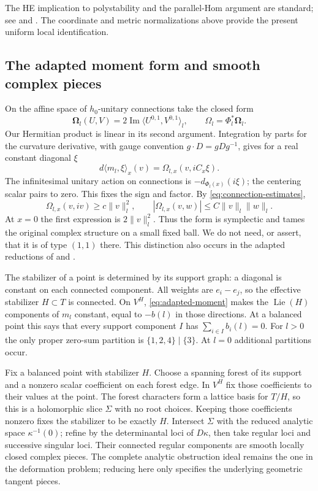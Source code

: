 \documentclass[11pt]{amsart}
\theoremstyle{definition}
\theoremstyle{remark}
\newcommand{\Lie}{\operatorname{Lie}}
\begin{document}
The HE implication to polystability and the parallel-Hom argument are
standard; see \cite[Theorem~5.8.3 and Proposition~4.1.7]{Kobayashi87}
and \cite[Section~4 and Proposition~7.4]{BuchdahlSchumacher20}.
The coordinate and metric normalizations above provide the present
uniform local identification.

\subsection{The adapted moment form and smooth complex pieces}
On the affine space of $h_0$-unitary connections take the closed form
\[
 \boldsymbol\Omega_l(U,V)
       =2\operatorname{Im}\langle U^{0,1},V^{0,1}\rangle_l,
 \qquad \Omega_l=\Phi_l^*\boldsymbol\Omega_l.
\]
Our Hermitian product is linear in its second argument. Integration
by parts for the curvature derivative, with gauge convention
$g\cdot D=gDg^{-1}$, gives for a real constant diagonal $\xi$
\begin{equation}\label{eq:adapted-moment}
 d\langle m_l,\xi\rangle_x(v)
       =\Omega_{l,x}(v,iC_x\xi).
\end{equation}
The infinitesimal unitary action on connections is
$-d_{\Phi_l(x)}(i\xi)$; the centering scalar pairs to zero.
This fixes the sign and factor. By \eqref{eq:connection-estimates},
\begin{equation}\label{eq:taming}
 \Omega_{l,x}(v,iv)\ge c\|v\|_l^2,\qquad
 |\Omega_{l,x}(v,w)|\le C\|v\|_l\|w\|_l.
\end{equation}
At $x=0$ the first expression is $2\|v\|_l^2$. Thus the form is
symplectic and tames the original complex structure on a small fixed
ball. We do not need, or assert, that it is of type $(1,1)$ there.
This distinction also occurs in the adapted reductions of
\cite[Section~3]{ClarkeTipler24} and \cite[Section~4.1]{Delloque25}.

The stabilizer of a point is determined by its support graph: a diagonal
is constant on each connected component. All weights are $e_i-e_j$,
so the effective stabilizer $H\subset T$ is connected. On $V^H$,
\eqref{eq:adapted-moment} makes the $\Lie(H)$ components of $m_l$
constant, equal to $-b(l)$ in those directions. At a balanced point
this says that every support component $I$ has $\sum_{i\in I}b_i(l)=0$.
For $l>0$ the only proper zero-sum partition is
$\{1,2,4\}\mid\{3\}$. At $l=0$ additional partitions occur.

Fix a balanced point with stabilizer $H$. Choose a spanning forest
of its support and a nonzero scalar coefficient on each forest edge.
In $V^H$ fix those coefficients to their values at the point. The
forest characters form a lattice basis for $T/H$, so this is a
holomorphic slice $\Sigma$ with no root choices. Keeping those
coefficients nonzero fixes the stabilizer to be exactly $H$.
Intersect $\Sigma$ with the reduced analytic space $\kappa^{-1}(0)$;
refine by the determinantal loci of $D\kappa$, then take regular
loci and successive singular loci. Their connected regular components
are smooth locally closed complex pieces. The complete analytic
obstruction ideal remains the one in the deformation problem; reducing
here only specifies the underlying geometric tangent pieces.
\end{document}
